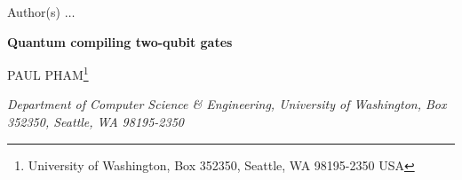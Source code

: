 \documentclass[twoside]{article}
\theoremstyle{plain}
\begin{document}
\setlength{\textheight}{8.0truein}    %

            {Author(s) $\ldots$}

\normalsize\textlineskip
\thispagestyle{empty}
\setcounter{page}{1}


\vspace*{0.88truein}

\alphfootnote


\centerline{\bf
Quantum compiling two-qubit gates}

\vspace*{0.37truein}
\centerline{\footnotesize
PAUL PHAM\footnote{University of Washington, Box 352350,
Seattle, WA 98195-2350 USA}}
\vspace*{0.015truein}
\centerline{\footnotesize\it Department of Computer Science & Engineering,
University of Washington,
Box 352350, Seattle, WA 98195-2350}
\vspace*{10pt}
\vspace*{0.225truein}

\vspace*{0.21truein}

\abstracts{
 
}{}{}

\vspace*{10pt}

\vspace*{3pt}

\vspace*{1pt}\textlineskip    %



















\end{document}
